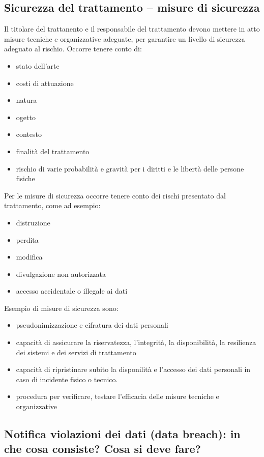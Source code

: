 \subsection{Sicurezza del trattamento – misure di sicurezza}

Il titolare del trattanento e il responsabile del trattamento devono mettere in atto misure tecniche e organizzative adeguate, per garantire un livello di sicurezza adeguato al rischio.
Occorre tenere conto di:
\begin{itemize}
    \item stato dell'arte
    \item costi di attuazione
    \item natura
    \item ogetto
    \item contesto
    \item finalità del trattamento
    \item rischio di varie probabilità e gravità per i diritti e le libertà delle persone fisiche
\end{itemize}
Per le misure di sicurezza occorre tenere conto dei rischi presentato dal trattamento, come ad esempio:
\begin{itemize}
    \item distruzione
    \item perdita
    \item modifica
    \item divulgazione non autorizzata
    \item accesso accidentale o illegale ai dati
\end{itemize}
Esempio di misure di sicurezza sono:
\begin{itemize}
    \item pseudonimizzazione e cifratura dei dati personali
    \item capacità di assicurare la riservatezza, l'integrità, la disponibilità, la resilienza dei sistemi e dei servizi di trattamento
    \item capacità di ripristinare subito la disponilità e l'accesso dei dati personali in caso di incidente fisico o tecnico.
    \item procedura per verificare, testare l'efficacia delle misure tecniche e organizzative
\end{itemize}

\subsection{Notifica violazioni dei dati (data breach): in che cosa consiste? Cosa si deve fare?}

